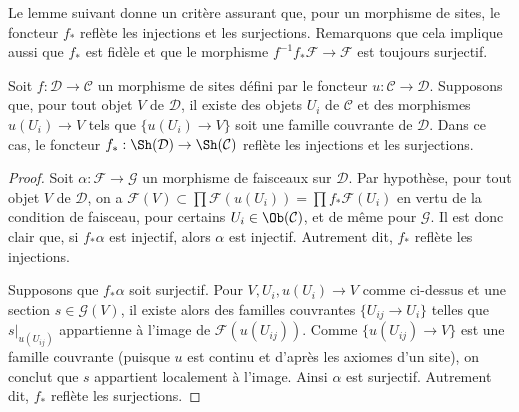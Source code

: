 \noindent
Le lemme suivant donne un critère assurant que, pour un morphisme de sites,
le foncteur $f_*$ reflète les injections et les surjections.
Remarquons que cela implique aussi que $f_*$ est fidèle et que le
morphisme $f^{-1}f_*\mathcal{F} \to \mathcal{F}$ est toujours surjectif.

\begin{lemma}
\label{lemma-cover-from-below}
Soit $f : \mathcal{D} \to \mathcal{C}$ un morphisme de sites défini
par le foncteur $u : \mathcal{C} \to \mathcal{D}$.
Supposons que, pour tout objet $V$ de $\mathcal{D}$, il existe des objets
$U_i$ de $\mathcal{C}$ et des morphismes $u(U_i) \to V$ tels que
$\{u(U_i) \to V\}$ soit une famille couvrante de $\mathcal{D}$. Dans ce cas, le foncteur
$f_* : \Sh(\mathcal{D}) \to \Sh(\mathcal{C})$ reflète les
injections et les surjections.
\end{lemma}

\begin{proof}
Soit $\alpha : \mathcal{F} \to \mathcal{G}$ un morphisme de faisceaux
sur $\mathcal{D}$. Par hypothèse, pour tout objet $V$ de $\mathcal{D}$,
on a $\mathcal{F}(V) \subset \prod \mathcal{F}(u(U_i)) =
\prod f_*\mathcal{F}(U_i)$ en vertu de la condition de faisceau,
pour certains $U_i \in \Ob(\mathcal{C})$, et de même pour $\mathcal{G}$.
Il est donc clair que, si $f_*\alpha$ est injectif, alors
$\alpha$ est injectif. Autrement dit, $f_*$ reflète les injections.

\medskip\noindent
Supposons que $f_*\alpha$ soit surjectif. Pour $V, U_i, u(U_i) \to V$
comme ci-dessus et une section $s \in \mathcal{G}(V)$, il existe alors des familles couvrantes
$\{U_{ij} \to U_i\}$ telles que $s|_{u(U_{ij})}$ appartienne à l’image
de $\mathcal{F}(u(U_{ij}))$. Comme $\{u(U_{ij}) \to V\}$ est une famille couvrante
(puisque $u$ est continu et d’après les axiomes d’un site), on conclut que
$s$ appartient localement à l’image. Ainsi $\alpha$ est surjectif. Autrement
dit, $f_*$ reflète les surjections.
\end{proof}

